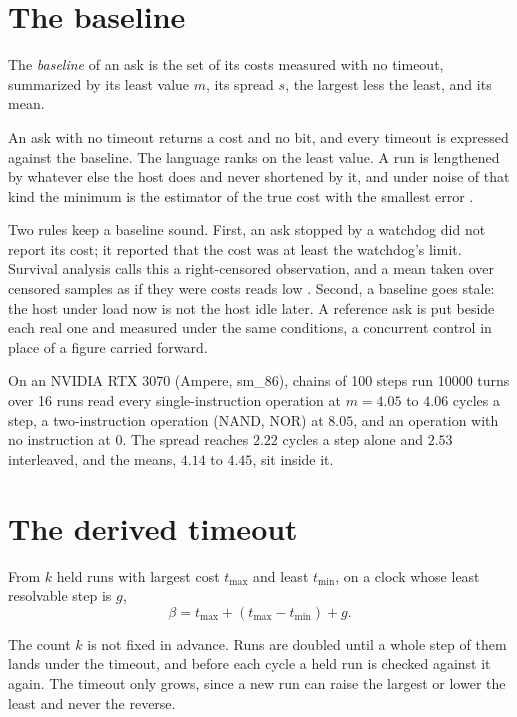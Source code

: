 \section{The baseline}

\begin{definition}[Baseline]
The \emph{baseline} of an ask is the set of its costs measured with no timeout, summarized by its
least value \(m\), its spread \(s\), the largest less the least, and its mean.
\end{definition}

An ask with no timeout returns a cost and no bit, and every timeout is expressed
against the baseline. The language ranks on the least value. A run is lengthened by whatever
else the host does and never shortened by it, and under noise of that kind the minimum is the
estimator of the true cost with the smallest error \cite{src:Chen-Revels}.

Two rules keep a baseline sound. First, an ask stopped by a watchdog did not report its cost; it
reported that the cost was at least the watchdog's limit. Survival analysis calls this a
right-censored observation, and a mean taken over censored samples as if they were costs reads
low \cite{src:Kaplan-Meier}. Second, a baseline goes stale: the host under load now is not the
host idle later. A reference ask is put beside each real one and measured under the same
conditions, a concurrent control in place of a figure carried forward.

On an NVIDIA RTX 3070 (Ampere, sm\_86), chains of 100 steps run 10000 turns over 16 runs read
every single-instruction operation at \(m = 4.05\) to \(4.06\) cycles a step, a two-instruction
operation (NAND, NOR) at \(8.05\), and an operation with no instruction at \(0\). The spread
reaches \(2.22\) cycles a step alone and \(2.53\) interleaved, and the means, \(4.14\) to \(4.45\),
sit inside it.

\section{The derived timeout}

\begin{definition}
From \(k\) held runs with largest cost \(t_{\max}\) and least \(t_{\min}\), on a clock whose least
resolvable step is \(g\),
\[
  \beta = t_{\max} + (t_{\max} - t_{\min}) + g.
\]
\end{definition}

The count \(k\) is not fixed in advance. Runs are doubled until a whole step of them lands under
the timeout, and before each cycle a held run is checked against it again. The timeout only grows,
since a new run can raise the largest or lower the least and never the reverse.

